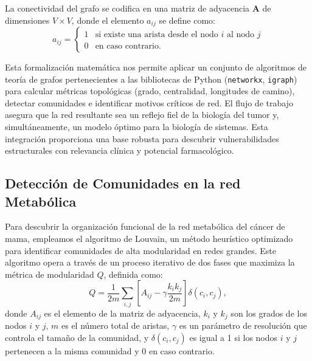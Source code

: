 \documentclass[12pt,spanish]{article}
\begin{document}
	La conectividad del grafo se codifica en una matriz de adyacencia $\mathbf{A}$ de dimensiones $V \times V$, donde el elemento $a_{ij}$ se define como:
	\[
	a_{ij} = 
	\begin{cases} 
		1 & \text{si existe una arista desde el nodo } i \text{ al nodo } j \\
		0 & \text{en caso contrario.}
	\end{cases}
	\]
	
	Esta formalización matemática nos permite aplicar un conjunto de algoritmos de teoría de grafos pertenecientes a las bibliotecas de Python (\texttt{networkx}, \texttt{igraph}) para calcular métricas topológicas (grado, centralidad, longitudes de camino), detectar comunidades e identificar motivos críticos de red. El flujo de trabajo asegura que la red resultante sea un reflejo fiel de la biología del tumor y, simultáneamente, un modelo óptimo para la biología de sistemas. Esta integración proporciona una base robusta para descubrir vulnerabilidades estructurales con relevancia clínica y potencial farmacológico.
	
	\subsection{Detección de Comunidades en la red Metabólica}
	
	Para descubrir la organización funcional de la red metabólica del cáncer de mama, empleamos el algoritmo de Louvain, un método heurístico optimizado para identificar comunidades de alta modularidad en redes grandes. Este algoritmo opera a través de un proceso iterativo de dos fases que maximiza la métrica de modularidad $Q$, definida como:
	\[
	Q = \frac{1}{2m} \sum_{i,j} \left[ A_{ij} - \gamma \frac{k_i k_j}{2m} \right] \delta(c_i, c_j),
	\]
	donde $A_{ij}$ es el elemento de la matriz de adyacencia, $k_i$ y $k_j$ son los grados de los nodos $i$ y $j$, $m$ es el número total de aristas, $\gamma$ es un parámetro de resolución que controla el tamaño de la comunidad, y $\delta(c_i, c_j)$ es igual a 1 si los nodos $i$ y $j$ pertenecen a la misma comunidad y 0 en caso contrario.
	
\end{document}
